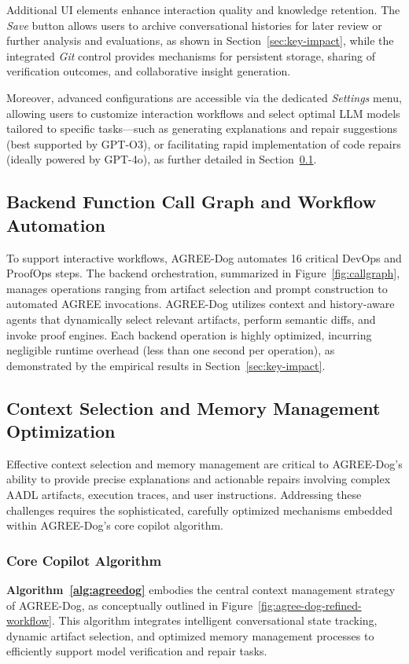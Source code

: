 Additional UI elements enhance interaction quality and knowledge retention. The \textit{Save} button allows users to archive conversational histories for later review or further analysis and evaluations, as shown in Section~\ref{sec:key-impact}, while the integrated \textit{Git} control provides mechanisms for persistent storage, sharing of verification outcomes, and collaborative insight generation. 

Moreover, advanced configurations are accessible via the dedicated \textit{Settings} menu, allowing users to customize interaction workflows and select optimal LLM models tailored to specific tasks—such as generating explanations and repair suggestions (best supported by GPT-O3), or facilitating rapid implementation of code repairs (ideally powered by GPT-4o), as further detailed in Section~\ref{sec:workflow}.

\subsection{Backend Function Call Graph and Workflow Automation}
\label{sec:workflow}

To support interactive workflows, AGREE-Dog automates 16 critical DevOps and ProofOps steps. The backend orchestration, summarized in Figure~\ref{fig:callgraph}, manages operations ranging from artifact selection and prompt construction to automated AGREE invocations. AGREE-Dog utilizes context and history-aware agents that dynamically select relevant artifacts, perform semantic diffs, and invoke proof engines. Each backend operation is highly optimized, incurring negligible runtime overhead (less than one second per operation), as demonstrated by the empirical results in Section~\ref{sec:key-impact}.


\subsection{Context Selection and Memory Management Optimization}

Effective context selection and memory management are critical to AGREE-Dog’s ability to provide precise explanations and actionable repairs involving complex AADL artifacts, execution traces, and user instructions. Addressing these challenges requires the sophisticated, carefully optimized mechanisms embedded within AGREE-Dog’s core copilot algorithm.

\subsubsection{Core Copilot Algorithm}
\textbf{Algorithm~\ref{alg:agreedog}} embodies the central context management strategy of AGREE-Dog, as conceptually outlined in Figure~\ref{fig:agree-dog-refined-workflow}. This algorithm integrates intelligent conversational state tracking, dynamic artifact selection, and optimized memory management processes to efficiently support model verification and repair tasks.

